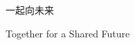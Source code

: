\documentclass{ctexart}
\begin{document}
  {\huge 一起向未来\par}
  Together for a Shared Future
\end{document}
